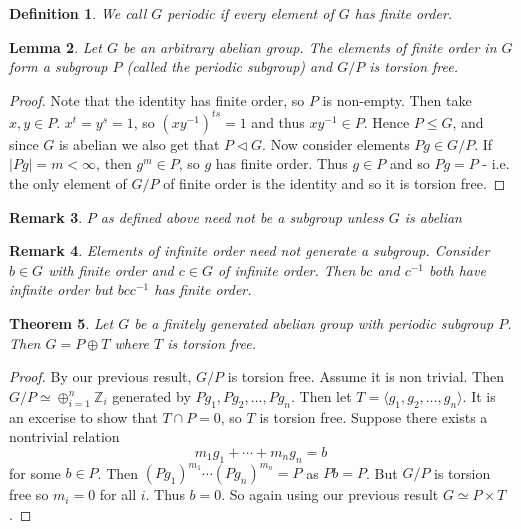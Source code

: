 \documentclass[a4paper,10pt]{article}
\newcommand{\ZZ}{\mathbb{Z}}
\newtheorem{thm}{Theorem}
\newtheorem{Def}[thm]{Definition}
\newtheorem{Lem}[thm]{Lemma}
\newtheorem{rem}[thm]{Remark}
\begin{document}
\begin{Def}
We call $G$ periodic if every element of $G$ has finite order. 
\end{Def}

\begin{Lem}
Let $G$ be an arbitrary abelian group. The elements of finite order in $G$ form a subgroup $P$ (called the periodic subgroup) and $G / P$ is torsion free. 
\end{Lem}

\begin{proof}
Note that the identity has finite order, so $P$ is non-empty. Then take $x,y \in P$. $x^t = y^s = 1$, so $(xy^{-1})^{ts} = 1$ and thus $xy^{-1} \in P$. Hence $P \leq G$, and since $G$ is abelian we also get that $P \triangleleft G$. Now consider elements $Pg \in G / P$. If $|Pg| = m < \infty$, then $g^m \in P$, so $g$ has finite order. Thus $g \in P$ and so $Pg = P$ - i.e. the only element of $G / P$ of finite order is the identity and so it is torsion free. 
\end{proof}


\begin{rem}
$P$ as defined above need not be a subgroup unless $G$ is abelian
\end{rem}

\begin{rem}
Elements of infinite order need not generate a subgroup. Consider $b \in G$ with finite order and $c \in G$ of infinite order. Then $bc$ and $c^{-1}$ both have infinite order but $b c c^{-1}$ has finite order. 
\end{rem}

\begin{thm}
Let $G$ be a finitely generated abelian group with periodic subgroup $P$. Then $G = P \oplus T$ where $T$ is torsion free. 
\end{thm}

\begin{proof}
By our previous result, $G / P$ is torsion free. Assume it is non trivial. Then $G / P \simeq \oplus_{i = 1}^n \ZZ_i$ generated by $Pg_1, Pg_2, \dots, Pg_n$. Then let $T =  \langle g_1, g_2, \dots, g_n \rangle$. It is an excerise to show that $T \cap P = 0$, so $T$ is torsion free. Suppose there exists a nontrivial relation
\[ m_1g_1 + \cdots + m_n g_n = b \]
for some $b \in P$. Then $(Pg_1)^{m_1} \cdots (Pg_n)^{m_n} = P$ as $Pb = P$. But $G / P$ is torsion free so $m_i = 0$ for all $i$. Thus $b = 0$. So again using our previous result $G \simeq P \times T$. 
\end{proof}
\end{document}
